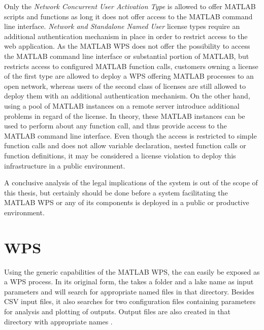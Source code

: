   Only the \emph{Network Concurrent User Activation Type} is allowed to offer MATLAB scripts and functions as long it does not offer access to the MATLAB command line interface. \emph{Network and Standalone Named User} license types require an additional authentication mechanism in place in order to restrict access to the web application. As the MATLAB WPS does not offer the possibility to access the MATLAB command line interface or substantial portion of MATLAB, but restricts access to configured MATLAB function calls, customers owning a license of the first type are allowed to deploy a \ac{WPS} offering MATLAB processes to an open network, whereas users of the second class of licenses are still allowed to deploy them with an additional authentication mechanism. On the other hand, using a pool of MATLAB instances on a remote server introduce additional problems in regard of the license. In theory, these MATLAB instances can be used to perform about any function call, and thus provide access to the MATLAB command line interface. Even though the access is restricted to simple function calls and does not allow variable declaration, nested function calls or function definitions, it may be considered a license violation to deploy this infrastructure in a public environment.

  A conclusive analysis of the legal implications of the system is out of the scope of this thesis, but certainly should be done before a system facilitating the MATLAB WPS or any of its components is deployed in a public or productive environment.
\section{\la WPS}
  \label{sec:matlab:la}
  Using the generic capabilities of the MATLAB WPS, the \la can easily be exposed as a \ac{WPS} process. In its original form, the \la takes a folder and a lake name as input parameters and will search for appropriate named files in that directory. Besides CSV input files, it also searches for two configuration files containing parameters for analysis and plotting of outputs. Output files are also created in that directory with appropriate names \citep{lamanual}.

